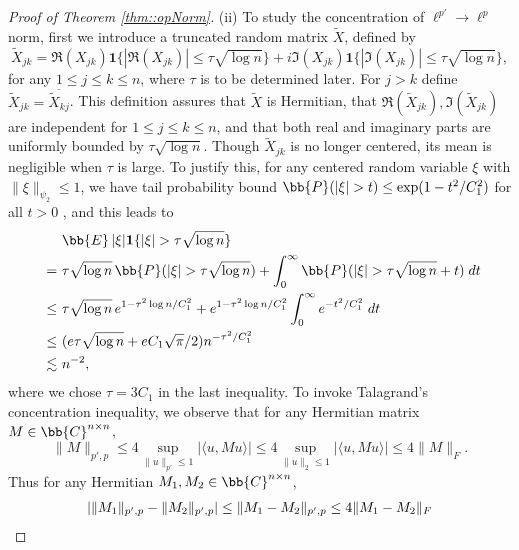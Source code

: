 \documentclass[12pt]{article}%
\theoremstyle{plain}%
\theoremstyle{remark}
\begin{document}
\begin{proof}[Proof of Theorem \ref{thm::opNorm}]
(ii) To study the concentration of $\ell^{p'} \to \ell^p$ norm, first we introduce a truncated random matrix $\widetilde{X}$, defined by 
\begin{equation*}
\tilde{X}_{jk} = \Re(X_{jk}) \mathbf{1}\{ |\Re(X_{jk}) | \le \tau \sqrt{\log n} \} + i \Im(X_{jk}) \mathbf{1} \{ |\Im(X_{jk})| \le \tau \sqrt{\log n} \}, 
\end{equation*}
for any $1 \le j \le k \le n$, where $\tau$ is to be determined later. For $j > k$ define $\tilde{X}_{jk} = \overline{ \tilde{X}_{kj}}$. This definition assures that $\widetilde{X}$ is Hermitian, that $\Re(\tilde{X}_{jk}), \Im(\tilde{X}_{jk})$ are independent for $1 \le j \le k \le n$, and that both real and imaginary parts are uniformly bounded by $\tau \sqrt{\log n}$. Though $\widetilde{X}_{jk}$ is no longer centered, its mean is negligible when $\tau$ is large. To justify this, for any centered random variable $\xi$ with $\| \xi \|_{\psi_2} \le 1$, we have tail probability bound $\bb{P} ( | \xi | > t ) \le \exp( 1 - t^2 / C_1^2)$ for all $t>0$ \citep{Ver10}, and this leads to
\begin{align}
~~~~ & ~ 
\bb{E} \, | \xi | \mathbf{1} \{ | \xi | > \tau \sqrt{\log n} \}  \notag \\
= & ~ \tau \sqrt{\log n} \, \bb{P} ( | \xi | > \tau \sqrt{\log n} ) + \int_{0}^{\infty} \bb{P} ( | \xi | > \tau \sqrt{\log n} + t) \; dt \notag \\
\le& ~ \tau \sqrt{\log n}\, e^{1 - \tau^2 \log n / C_1^2} + e^{1 - \tau^2 \log n / C_1^2} \int_0^\infty e^{-t^2/C_1^2} \; dt \notag \\
\le & ~ (e \tau \sqrt{\log n}  + eC_1 \sqrt{\pi}/2) n^{-\tau^2/C_1^2} \notag \\
\lesssim & ~ n^{-2}, \label{ineqn::truncDev}
\end{align}
where we chose $\tau = 3C_1$ in the last inequality. To invoke Talagrand's concentration inequality, we observe that for any Hermitian matrix $M \in \bb{C}^{n \times n}$,
\begin{equation*}
\| M \|_{p',p} \le 4 \sup_{\| u \|_{p'} \le 1 } | \langle u, Mu \rangle | \le 4 \sup_{\| u \|_2 \le 1 } | \langle u, Mu \rangle | \le 4 \| M \|_F.
\end{equation*}
Thus for any Hermitian $M_1,M_2 \in \bb{C}^{n \times n}$, 
\begin{align}
| \| M_1 \|_{p',p} - \| M_2 \|_{p',p} | &\le \| M_1 - M_2 \|_{p',p} \le 4\|M_1 - M_2 \|_F \notag \\

\end{align}
\end{proof}
\end{document}
